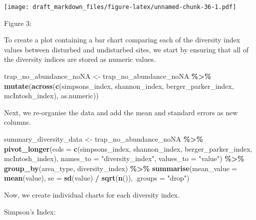 \documentclass[
]{article}
\newenvironment{Shaded}{\begin{snugshade}}{\end{snugshade}}
\newcommand{\AttributeTok}[1]{\textcolor[rgb]{0.13,0.29,0.53}{#1}}
\newcommand{\FunctionTok}[1]{\textcolor[rgb]{0.13,0.29,0.53}{\textbf{#1}}}
\newcommand{\NormalTok}[1]{#1}
\newcommand{\OtherTok}[1]{\textcolor[rgb]{0.56,0.35,0.01}{#1}}
\newcommand{\SpecialCharTok}[1]{\textcolor[rgb]{0.81,0.36,0.00}{\textbf{#1}}}
\newcommand{\StringTok}[1]{\textcolor[rgb]{0.31,0.60,0.02}{#1}}
\begin{document}
\texttt{[image: draft\_markdown\_files/figure-latex/unnamed-chunk-36-1.pdf]}

Figure 3:

To create a plot containing a bar chart comparing each of the diversity
index values between disturbed and undisturbed sites, we start by
ensuring that all of the diversity indices are stored as numeric values.

\begin{Shaded}
\begin{Highlighting}[]
\NormalTok{trap\_no\_abundance\_noNA }\OtherTok{\textless{}{-}}\NormalTok{ trap\_no\_abundance\_noNA }\SpecialCharTok{\%\textgreater{}\%}
    \FunctionTok{mutate}\NormalTok{(}\FunctionTok{across}\NormalTok{(}\FunctionTok{c}\NormalTok{(simpsons\_index, shannon\_index, berger\_parker\_index, mcIntosh\_index), as.numeric))}
\end{Highlighting}
\end{Shaded}

Next, we re-organise the data and add the mean and standard errors as
new columns.

\begin{Shaded}
\begin{Highlighting}[]
\NormalTok{  summary\_diversity\_data }\OtherTok{\textless{}{-}}\NormalTok{ trap\_no\_abundance\_noNA }\SpecialCharTok{\%\textgreater{}\%}
    \FunctionTok{pivot\_longer}\NormalTok{(}\AttributeTok{cols =} \FunctionTok{c}\NormalTok{(simpsons\_index, shannon\_index, berger\_parker\_index, mcIntosh\_index),}
                 \AttributeTok{names\_to =} \StringTok{"diversity\_index"}\NormalTok{,}
                 \AttributeTok{values\_to =} \StringTok{"value"}\NormalTok{) }\SpecialCharTok{\%\textgreater{}\%}
    \FunctionTok{group\_by}\NormalTok{(area\_type, diversity\_index) }\SpecialCharTok{\%\textgreater{}\%}
    \FunctionTok{summarise}\NormalTok{(}\AttributeTok{mean\_value =} \FunctionTok{mean}\NormalTok{(value),}
              \AttributeTok{se =} \FunctionTok{sd}\NormalTok{(value) }\SpecialCharTok{/} \FunctionTok{sqrt}\NormalTok{(}\FunctionTok{n}\NormalTok{()),}
              \AttributeTok{.groups =} \StringTok{"drop"}\NormalTok{)}
\end{Highlighting}
\end{Shaded}

Now, we create individual charts for each diversity index.

Simpson's Index:
\end{document}
